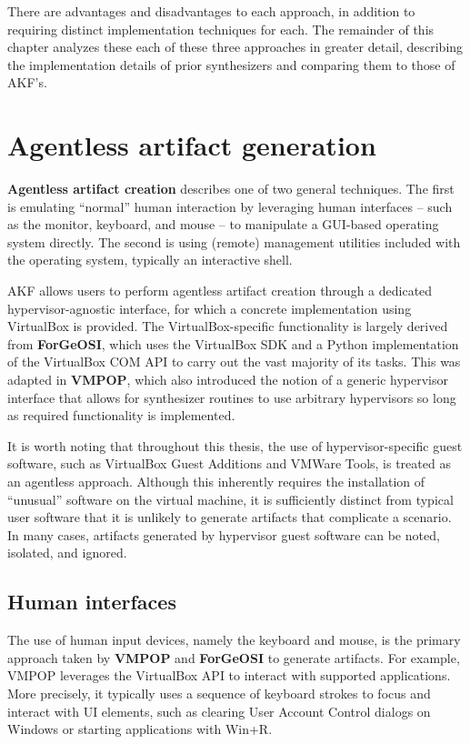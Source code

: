 \documentclass[letterpaper,12pt]{report}
\begin{document}
There are advantages and disadvantages to each approach, in addition to
requiring distinct implementation techniques for each. The remainder of
this chapter analyzes these each of these three approaches in greater
detail, describing the implementation details of prior synthesizers and
comparing them to those of AKF's.

\section{Agentless artifact
generation}\label{agentless-artifact-generation}

\textbf{Agentless artifact creation} describes one of two general
techniques. The first is emulating ``normal'' human interaction by
leveraging human interfaces -- such as the monitor, keyboard, and mouse
-- to manipulate a GUI-based operating system directly. The second is
using (remote) management utilities included with the operating system,
typically an interactive shell.

AKF allows users to perform agentless artifact creation through a
dedicated hypervisor-agnostic interface, for which a concrete
implementation using VirtualBox is provided. The VirtualBox-specific
functionality is largely derived from \textbf{ForGeOSI}, which uses the
VirtualBox SDK and a Python implementation of the VirtualBox COM API to
carry out the vast majority of its tasks. This was adapted in
\textbf{VMPOP}, which also introduced the notion of a generic hypervisor
interface that allows for synthesizer routines to use arbitrary
hypervisors so long as required functionality is implemented.

It is worth noting that throughout this thesis, the use of
hypervisor-specific guest software, such as VirtualBox Guest Additions
and VMWare Tools, is treated as an agentless approach. Although this
inherently requires the installation of ``unusual'' software on the
virtual machine, it is sufficiently distinct from typical user software
that it is unlikely to generate artifacts that complicate a scenario. In
many cases, artifacts generated by hypervisor guest software can be
noted, isolated, and ignored.

\subsection{Human interfaces}\label{human-interfaces}

The use of human input devices, namely the keyboard and mouse, is the
primary approach taken by \textbf{VMPOP} and \textbf{ForGeOSI} to
generate artifacts. For example, VMPOP leverages the VirtualBox API to
interact with supported applications. More precisely, it typically uses
a sequence of keyboard strokes to focus and interact with UI elements,
such as clearing User Account Control dialogs on Windows or starting
applications with Win+R.
\end{document}
